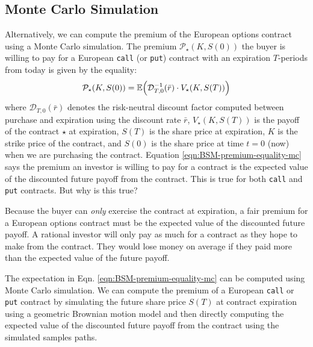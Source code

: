 \documentclass[11pt]{article}
\theoremstyle{definition}
\begin{document}
\subsection*{Monte Carlo Simulation}
Alternatively, we can compute the premium of the European options contract using a Monte Carlo simulation.
The premium $\mathcal{P}_{\star}(K,S(0))$ the buyer is willing to pay for a European \texttt{call} (or \texttt{put}) contract with an expiration $T$-periods from today is given by the equality:
\begin{equation}\label{eqn:BSM-premium-equality-mc}
\mathcal{P}_{\star}(K,S(0)) = \mathbb{E}\Bigl(\mathcal{D}^{-1}_{T,0}(\bar{r})\cdot{V_{\star}}(K,S(T))\Bigr)
\end{equation}
where $\mathcal{D}_{T,0}(\bar{r})$ denotes the risk-neutral discount factor computed between purchase and expiration using the discount rate $\bar{r}$, $V_{\star}(K, S(T))$ is the payoff of the contract $\star$ at expiration, $S(T)$ is the share price at expiration, $K$ is the strike price of the contract, and $S(0)$ is the share price at time $t=0$ (now) when we are purchasing the contract. Equation \ref{eqn:BSM-premium-equality-mc} says the premium an investor is willing to pay for a contract is the expected value of the discounted future payoff from the contract. This is true for both \texttt{call} and \texttt{put} contracts. But why is this true?

\begin{concept}
Because the buyer can \textit{only} exercise the contract at expiration, a fair premium for a European options contract must be the expected value of the discounted future payoff. A rational investor will only pay as much for a contract as they hope to make from the contract. 
They would lose money on average if they paid more than the expected value of the future payoff.
\end{concept}
The expectation in Eqn. \ref{eqn:BSM-premium-equality-mc} can be computed using Monte Carlo simulation.
We can compute the premium of a European \texttt{call} or \texttt{put} contract by simulating the future share price $S(T)$ at contract expiration
using a geometric Brownian motion model and then directly computing the expected value of the discounted future payoff from the contract 
using the simulated samples paths. 
\end{document}
